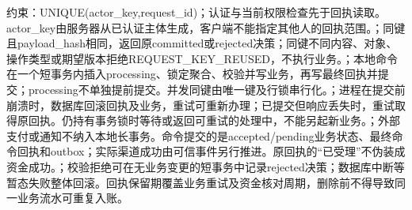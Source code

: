 \documentclass[UTF8,12pt,a4paper,fontset=none]{ctexart}
\begin{document}
约束：UNIQUE(\allowbreak{}actor\_\allowbreak{}key,\allowbreak{}request\_\allowbreak{}id)\allowbreak{}；认证与当前权限检查先于回执读取。actor\_\allowbreak{}key由服务器从已认证主体生成，客户端不能指定其他人的回执范围。；同键且payload\_\allowbreak{}hash相同，返回原committed或rejected决策；同键不同内容、对象、操作类型或期望版本拒绝REQUEST\_\allowbreak{}KEY\_\allowbreak{}REUSED，不执行业务。；本地命令在一个短事务内插入processing、锁定聚合、校验并写业务，再写最终回执并提交；processing不单独提前提交。并发同键由唯一键及行锁串行化。；进程在提交前崩溃时，数据库回滚回执及业务，重试可重新办理；已提交但响应丢失时，重试取得原回执。仍持有事务锁时等待或返回可重试的处理中，不能另起新业务。；外部支付或通知不纳入本地长事务。命令提交的是accepted/\allowbreak{}pending业务状态、最终命令回执和outbox；实际渠道成功由可信事件另行推进。原回执的“已受理”不伪装成资金成功。；校验拒绝可在无业务变更的短事务中记录rejected决策；数据库中断等暂态失败整体回滚。回执保留期覆盖业务重试及资金核对周期，删除前不得导致同一业务流水可重复入账。\par
\Needspace{208pt}
\end{document}
